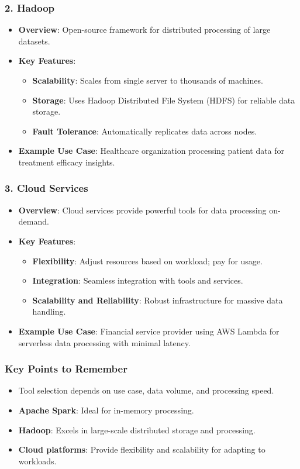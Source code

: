 \documentclass{beamer}
\begin{document}
\begin{frame}[fragile]
    \frametitle{2. Hadoop}
    \begin{itemize}
        \item \textbf{Overview}: Open-source framework for distributed processing of large datasets.
        \item \textbf{Key Features}:
        \begin{itemize}
            \item \textbf{Scalability}: Scales from single server to thousands of machines.
            \item \textbf{Storage}: Uses Hadoop Distributed File System (HDFS) for reliable data storage.
            \item \textbf{Fault Tolerance}: Automatically replicates data across nodes.
        \end{itemize}
        \item \textbf{Example Use Case}: Healthcare organization processing patient data for treatment efficacy insights.
    \end{itemize}
\end{frame}

\begin{frame}[fragile]
    \frametitle{3. Cloud Services}
    \begin{itemize}
        \item \textbf{Overview}: Cloud services provide powerful tools for data processing on-demand.
        \item \textbf{Key Features}:
        \begin{itemize}
            \item \textbf{Flexibility}: Adjust resources based on workload; pay for usage.
            \item \textbf{Integration}: Seamless integration with tools and services.
            \item \textbf{Scalability and Reliability}: Robust infrastructure for massive data handling.
        \end{itemize}
        \item \textbf{Example Use Case}: Financial service provider using AWS Lambda for serverless data processing with minimal latency.
    \end{itemize}
\end{frame}

\begin{frame}[fragile]
    \frametitle{Key Points to Remember}
    \begin{itemize}
        \item Tool selection depends on use case, data volume, and processing speed.
        \item \textbf{Apache Spark}: Ideal for in-memory processing.
        \item \textbf{Hadoop}: Excels in large-scale distributed storage and processing.
        \item \textbf{Cloud platforms}: Provide flexibility and scalability for adapting to workloads.
    \end{itemize}
\end{frame}
\end{document}
